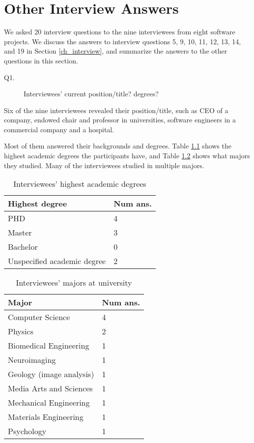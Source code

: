 \chapter{Other Interview Answers}
\label{ap_interview}

We asked 20 interview questions to the nine interviewees from eight software projects. We discuss the answers to interview questions 5, 9, 10, 11, 12, 13, 14, and 19 in Section \ref{ch_interview}, and summarize the answers to the other questions in this section.

\begin{description}
\item[Q1.] Interviewees’ current position/title? degrees?
\end{description}

Six of the nine interviewees revealed their position/title, such as CEO of a company, endowed chair and professor in universities, software engineers in a commercial company and a hospital.

Most of them answered their backgrounds and degrees. Table \ref{tab_q1_degrees} shows the highest academic degrees the participants have, and Table \ref{tab_q1_majors} shows what majors they studied. Many of the interviewees studied in multiple majors.

\begin{table}[H]
\centering
\begin{tabular}{ll}
\hline
Highest degree & Num ans. \\ \hline
PHD & 4 \\
Master & 3 \\
Bachelor & 0 \\
Unspecified academic degree & 2 \\ \hline
\end{tabular}
\caption{\label{tab_q1_degrees}Interviewees' highest academic degrees}
\end{table}

\begin{table}[H]
\centering
\begin{tabular}{ll}
\hline
Major & Num ans. \\ \hline
Computer Science & 4 \\
Physics & 2 \\
Biomedical Engineering & 1 \\
Neuroimaging & 1 \\
Geology (image analysis) & 1 \\
Media Arts and Sciences & 1 \\
Mechanical Engineering & 1 \\
Materials Engineering & 1 \\
Psychology & 1 \\ \hline
\end{tabular}
\caption{\label{tab_q1_majors}Interviewees' majors at university}
\end{table}

